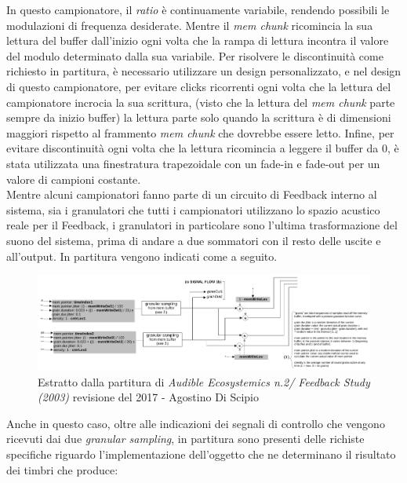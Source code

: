 In questo campionatore, il \textit{ratio} è continuamente variabile, 
rendendo possibili le modulazioni di frequenza desiderate. 
Mentre il \textit{mem chunk} ricomincia la sua lettura del buffer dall'inizio 
ogni volta che la rampa di lettura incontra il valore del modulo determinato dalla sua variabile.
Per risolvere le discontinuità come richiesto in partitura, 
è necessario utilizzare un design personalizzato,
e nel design di questo campionatore, 
per evitare clicks ricorrenti ogni volta che la lettura del campionatore incrocia la sua scrittura, 
(visto che la lettura del \textit{mem chunk} parte sempre da inizio buffer)
la lettura parte solo quando la scrittura è di dimensioni maggiori rispetto al frammento \textit{mem chunk} 
che dovrebbe essere letto.
Infine, per evitare discontinuità ogni volta che la lettura ricomincia a leggere il buffer da 0, 
è stata utilizzata una finestratura trapezoidale con un fade-in e fade-out 
per un valore di campioni costante. \\
Mentre alcuni campionatori fanno parte di un circuito di Feedback interno al sistema, 
sia i granulatori che tutti i campionatori utilizzano lo spazio acustico reale per il Feedback,
i granulatori in particolare sono l'ultima trasformazione del suono del sistema, prima di andare a 
due sommatori con il resto delle uscite e all'output.
In partitura vengono indicati come a seguito.

\begin{figure}[h!]
\begin{center}
    \includegraphics[width=14cm]{figures/GRANULATORSFeedbackstudy2017.pdf}
    \caption{Estratto dalla partitura di \textit{Audible Ecosystemics n.2/ Feedback Study (2003)}
    revisione del 2017 - Agostino Di Scipio}
    \vspace{0.5cm}
\end{center}
\end{figure}

Anche in questo caso, oltre alle indicazioni dei segnali di controllo che vengono
ricevuti dai due \textit{granular sampling}, 
in partitura sono presenti delle richiste specifiche riguardo l'implementazione 
dell'oggetto che ne determinano il risultato dei timbri che produce: 

